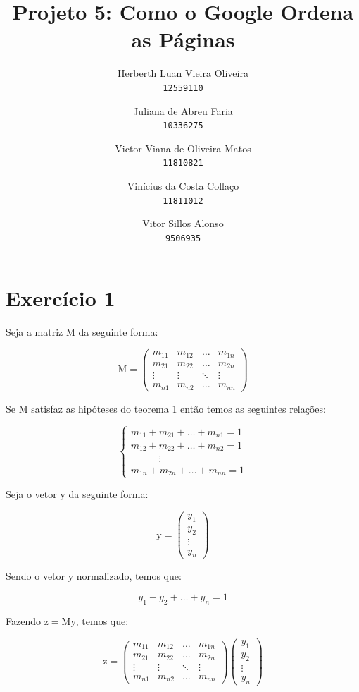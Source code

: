 \documentclass[a4paper, 12pt]{article}
\title{Projeto 5: Como o Google Ordena as Páginas}
\author{
  Herberth Luan Vieira Oliveira\\
  \texttt{12559110}
  \and
  Juliana de Abreu Faria\\
  \texttt{10336275}
  \and
  Victor Viana de Oliveira Matos\\
  \texttt{11810821}
  \and
  Vinícius da Costa Collaço\\
  \texttt{11811012}
  \and
  Vitor Sillos Alonso\\
  \texttt{9506935}
}
\begin{document}
\maketitle

\section{Exercício 1}

Seja a matriz $\mathrm{M}$ da seguinte forma:

$$\mathrm{M}=\begin{pmatrix}
m_{11}&m_{12}&\dots &m_{1n}\\
m_{21}&m_{22}&\dots &m_{2n}\\
\vdots &\vdots &\ddots &\vdots \\
m_{n1}&m_{n2}&\dots &m_{nn}
\end{pmatrix}$$

Se $\mathrm{M}$ satisfaz as hipóteses do teorema 1 então temos as seguintes relações:

$$\begin{cases}
m_{11}+m_{21}+\dots +m_{n1}=1\\
m_{12}+m_{22}+\dots +m_{n2}=1\\
\ \ \ \ \ \ \ \ \ \ \ \ \ \vdots \\
m_{1n}+m_{2n}+\dots +m_{nn}=1
\end{cases}$$

Seja o vetor $\mathrm{y}$ da seguinte forma:

$$\mathrm{y}=\begin{pmatrix}
y_1\\
y_2\\
\vdots \\
y_n
\end{pmatrix}$$

Sendo o vetor $\mathrm{y}$ normalizado, temos que:

$$y_1+y_2+\dots +y_n=1$$

Fazendo $\mathrm{z}=\mathrm{M}\mathrm{y}$, temos que:

$$\mathrm{z}=\begin{pmatrix}
m_{11}&m_{12}&\dots &m_{1n}\\
m_{21}&m_{22}&\dots &m_{2n}\\
\vdots &\vdots &\ddots &\vdots \\
m_{n1}&m_{n2}&\dots &m_{nn}
\end{pmatrix}\begin{pmatrix}
y_1\\
y_2\\
\vdots \\
y_n
\end{pmatrix}$$
\end{document}
